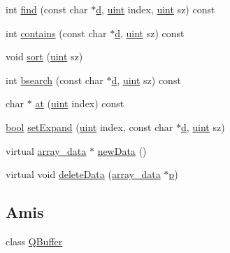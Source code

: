 \begin{DoxyCompactItemize}
\item 
int \hyperlink{class_q_g_array_ad563afc839e4c042460ccb0bac70816e}{find} (const char $\ast$\hyperlink{060__command__switch_8tcl_af43f4b1f0064a33b2d662af9f06d3a00}{d}, \hyperlink{qglobal_8h_a4d3943ddea65db7163a58e6c7e8df95a}{uint} index, \hyperlink{qglobal_8h_a4d3943ddea65db7163a58e6c7e8df95a}{uint} sz) const 
\item 
int \hyperlink{class_q_g_array_a684c29897af9b7bd32b7e71b3c5ad2ce}{contains} (const char $\ast$\hyperlink{060__command__switch_8tcl_af43f4b1f0064a33b2d662af9f06d3a00}{d}, \hyperlink{qglobal_8h_a4d3943ddea65db7163a58e6c7e8df95a}{uint} sz) const 
\item 
void \hyperlink{class_q_g_array_a92d1332f73e37ca66c34725ae1a7024d}{sort} (\hyperlink{qglobal_8h_a4d3943ddea65db7163a58e6c7e8df95a}{uint} sz)
\item 
int \hyperlink{class_q_g_array_ae3fc6b36e54a583d185ccf69149d02d6}{bsearch} (const char $\ast$\hyperlink{060__command__switch_8tcl_af43f4b1f0064a33b2d662af9f06d3a00}{d}, \hyperlink{qglobal_8h_a4d3943ddea65db7163a58e6c7e8df95a}{uint} sz) const 
\item 
char $\ast$ \hyperlink{class_q_g_array_a4e9cc74c5db66a2d7ae71fb15c024019}{at} (\hyperlink{qglobal_8h_a4d3943ddea65db7163a58e6c7e8df95a}{uint} index) const 
\item 
\hyperlink{qglobal_8h_a1062901a7428fdd9c7f180f5e01ea056}{bool} \hyperlink{class_q_g_array_aa2b294d969877807c1ade888bc88fdfd}{set\+Expand} (\hyperlink{qglobal_8h_a4d3943ddea65db7163a58e6c7e8df95a}{uint} index, const char $\ast$\hyperlink{060__command__switch_8tcl_af43f4b1f0064a33b2d662af9f06d3a00}{d}, \hyperlink{qglobal_8h_a4d3943ddea65db7163a58e6c7e8df95a}{uint} sz)
\item 
virtual \hyperlink{struct_q_g_array_1_1array__data}{array\+\_\+data} $\ast$ \hyperlink{class_q_g_array_a184ba21c4bc4bc3e1370000b8098c227}{new\+Data} ()
\item 
virtual void \hyperlink{class_q_g_array_abacce3ed4db7d075d75314cb856e91db}{delete\+Data} (\hyperlink{struct_q_g_array_1_1array__data}{array\+\_\+data} $\ast$\hyperlink{060__command__switch_8tcl_a15229b450f26d8fa1c10bea4f3279f4d}{p})
\end{DoxyCompactItemize}
\subsection*{Amis}
\begin{DoxyCompactItemize}
\item 
class \hyperlink{class_q_g_array_a6e20d98ed3f0cea33e4221e417f1a021}{Q\+Buffer}
\end{DoxyCompactItemize}


